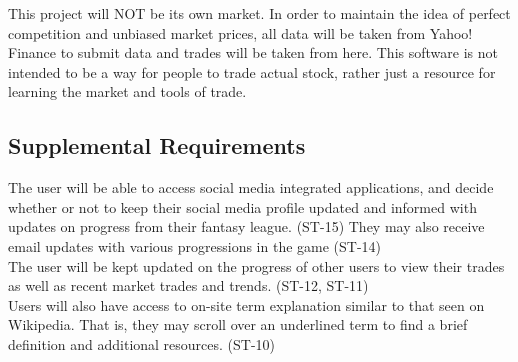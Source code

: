 This project will NOT be its own market. In order to maintain the idea of perfect competition
and unbiased market prices, all data will be taken from Yahoo! Finance to submit data and
trades will be taken from here. This software is not intended to be a way for people to
trade actual stock, rather just a resource for learning the market and tools of trade. \\

\subsection{Supplemental Requirements}
The user will be able to access social media integrated applications, and decide whether
or not to keep their social media profile updated and informed with updates on progress from
their fantasy league. (ST-15) They may also receive email updates with various progressions in
the game (ST-14)\\

The user will be kept updated on the progress of other users to view their trades as well as
recent market trades and trends. (ST-12, ST-11)\\

Users will also have access to on-site term explanation similar to that seen on Wikipedia.
That is, they may scroll over an underlined term to find a brief definition and additional
resources. (ST-10)\\


